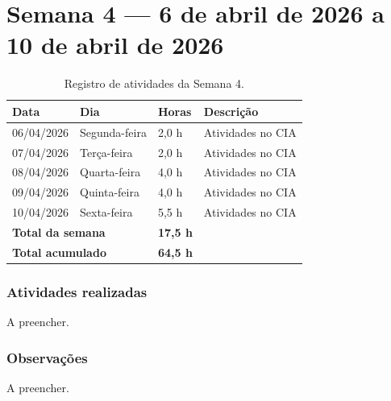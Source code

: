 
\section{Semana 4 --- 6 de abril de 2026 a 10 de abril de 2026}

\begin{table}[H]
\centering
\caption{Registro de atividades da Semana 4.}
\begin{tabular}{llll}
\toprule
\textbf{Data} & \textbf{Dia} & \textbf{Horas} & \textbf{Descrição} \\
\midrule
06/04/2026 & Segunda-feira & 2,0 h & Atividades no CIA \\
07/04/2026 & Terça-feira & 2,0 h & Atividades no CIA \\
08/04/2026 & Quarta-feira & 4,0 h & Atividades no CIA \\
09/04/2026 & Quinta-feira & 4,0 h & Atividades no CIA \\
10/04/2026 & Sexta-feira & 5,5 h & Atividades no CIA \\
\midrule
\multicolumn{2}{l}{\textbf{Total da semana}} & \textbf{17,5 h} & \\
\multicolumn{2}{l}{\textbf{Total acumulado}} & \textbf{64,5 h} & \\
\bottomrule
\end{tabular}
\end{table}

\subsubsection*{Atividades realizadas}

A preencher.

\subsubsection*{Observações}

A preencher.

